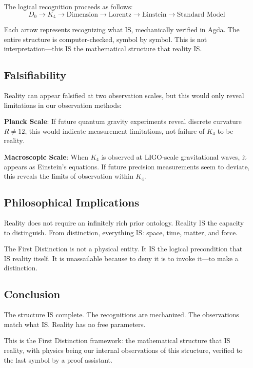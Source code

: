 \documentclass[11pt,a4paper]{book}
\begin{document}
The logical recognition proceeds as follows:
\[
D_0 \to K_4 \to \text{Dimension} \to \text{Lorentz} \to \text{Einstein} \to \text{Standard Model}
\]

Each arrow represents recognizing what IS, mechanically verified in Agda. The entire 
structure is computer-checked, symbol by symbol. This is not interpretation---this IS the mathematical 
structure that reality IS.

\subsection{Falsifiability}

Reality can appear falsified at two observation scales, but this would only reveal limitations in our observation methods:

\textbf{Planck Scale}: If future quantum gravity experiments reveal discrete curvature $R \neq 12$, this would indicate measurement limitations, not failure of $K_4$ to be reality.

\textbf{Macroscopic Scale}: When $K_4$ is observed at LIGO-scale gravitational waves, it appears as Einstein's equations. If future precision measurements seem to deviate, this reveals the limits of observation within $K_4$.

\subsection{Philosophical Implications}

Reality does not require an infinitely rich prior ontology. 
Reality IS the capacity to distinguish. From distinction, everything IS: space, time, matter, and force.

The First Distinction is not a physical entity. It IS the logical precondition that IS reality itself. It is unassailable because to deny it is to invoke it---to make a distinction.

\subsection{Conclusion}

The structure IS complete. The recognitions are mechanized. The observations match what IS. Reality has no free parameters.

This is the First Distinction framework: the mathematical structure that IS reality, with physics being our internal observations of this structure, verified to the last symbol by a proof assistant.
\end{document}
